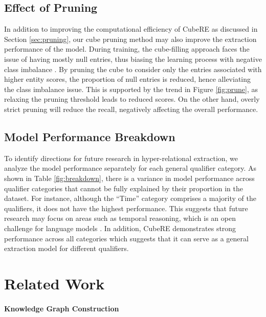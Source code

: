 \documentclass[11pt]{article}
\newcommand{\modelname}{CubeRE}
\begin{document}
\subsection{Effect of Pruning}
\label{sec:pruning_effect}

In addition to improving the computational efficiency of \modelname{} as discussed in Section \ref{sec:pruning}, our cube pruning method may also improve the extraction performance of the model. 
During training, the cube-filling approach faces the issue of having mostly null entries, thus biasing the learning process with negative class imbalance \cite{li-etal-2020-dice}.
By pruning the cube to consider only the entries associated with higher entity scores, the proportion of null entries is reduced, hence alleviating the class imbalance issue. 
This is supported by the trend in Figure \ref{fig:prune}, as relaxing the pruning threshold  leads to reduced  scores.
On the other hand, overly strict pruning will reduce the recall, negatively affecting the overall performance.

\subsection{Model Performance Breakdown}
To identify directions for future research in hyper-relational extraction, we analyze the model performance separately for each general qualifier category.
As shown in Table \ref{fig:breakdown}, there is a variance in model performance across qualifier categories that cannot be fully explained by their proportion in the dataset.
For instance, although the ``Time'' category comprises a majority of the qualifiers, it does not have the highest performance.
This suggests that future research may focus on areas such as temporal reasoning, which is an open challenge for language models \citep{vashishtha-etal-2020-temporal, dhingra-etal-2022-time}.
In addition, \modelname{} demonstrates strong performance across all categories which suggests that it can serve as a general extraction model for different qualifiers.

\section{Related Work}

\paragraph{Knowledge Graph Construction}
\end{document}

